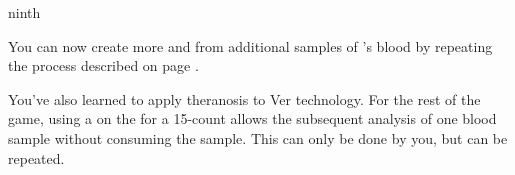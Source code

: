 \documentclass[greennotebook]{guildcamp4} %
\begin{document}
\begin{page}{ninth}

You can now create more \iVerDisorientationDrug{} and \iVerVulnerabilityDrug{} from additional samples of \cPlead{}'s blood by repeating the process described on page . 

You've also learned to apply theranosis to Ver technology. For the rest of the game, using a \iWrench{} on the \sBloodAnalyzer{} for a 15-count allows the subsequent analysis of one blood sample without consuming the sample. This can only be done by you, but can be repeated.

\end{page}

\endnotebook
\end{document}
